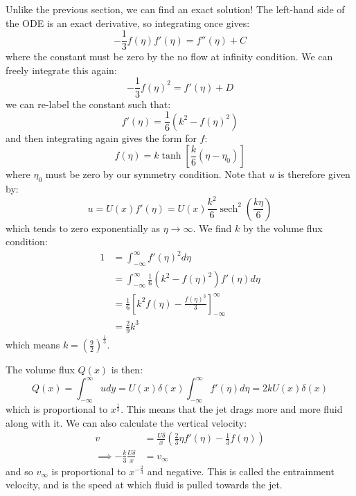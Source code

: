 \documentclass[../Main.tex]{subfiles}
\begin{document}
Unlike the previous section, we can find an exact solution! The left-hand side of the ODE is an exact derivative, so integrating once gives:
\begin{equation*}
    -\frac13 f(\eta) f'(\eta) = f''(\eta) + C
\end{equation*}
where the constant must be zero by the no flow at infinity condition. We can freely integrate this again:
\begin{equation*}
    -\frac13 f(\eta)^2 = f'(\eta) + D
\end{equation*}
we can re-label the constant such that:
\begin{equation*}
    f'(\eta) = \frac16 (k^2 - f(\eta)^2)
\end{equation*}
and then integrating again gives the form for $f$:
\begin{equation*}
    f(\eta) = k\tanh\left[\frac k 6 (\eta - \eta_0)\right]
\end{equation*}
where $\eta_0$ must be zero by our symmetry condition. Note that $u$ is therefore given by:
\begin{equation*}
    u = U(x) f'(\eta) = U(x) \frac{k^2}{6} \operatorname{sech}^2\left(\frac{k\eta}{6}\right)
\end{equation*}
which tends to zero exponentially as $\eta \to \infty$. We find $k$ by the volume flux condition:
\begin{align*}
    1 &= \int_{-\infty}^{\infty} f'(\eta)^2 d\eta \\
    &= \int_{-\infty}^{\infty} \frac16 \left(k^2 - f(\eta)^2\right)f'(\eta) d\eta \\
    &= \frac16 \left[k^2 f(\eta) - \frac{f(\eta)^3}{3}\right]_{-\infty}^\infty \\
    &= \frac29 k^3
\end{align*}
which means $k = \left(\frac92\right)^{\frac13}$.

The volume flux $Q(x)$ is then:
\begin{equation*}
    Q(x) = \int_{-\infty}^{\infty} u dy = U(x)\delta(x) \int_{-\infty}^{\infty} f'(\eta) d\eta = 2kU(x) \delta(x)
\end{equation*}
which is proportional to $x^{\frac13}$. This means that the jet drags more and more fluid along with it. We can also calculate the vertical velocity:
\begin{align*}
    v &= \frac{U\delta}{x} \left(\frac23 \eta f'(\eta) - \frac13 f(\eta)\right) \\
    \implies -\frac k 3 \frac{U\delta}{x} &= v_\infty
\end{align*}
and so $v_\infty$ is proportional to $x^{-\frac23}$ and negative. This is called the entrainment velocity, and is the speed at which fluid is pulled towards the jet.
\end{document}
